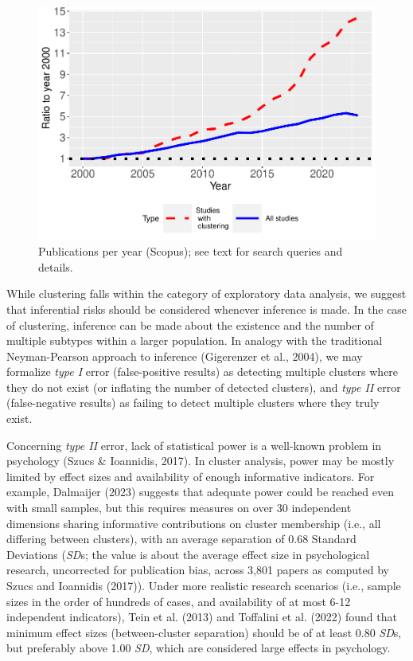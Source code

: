 \documentclass[
  man,floatsintext]{apa7}
\begin{document}
\begin{figure}

{\centering \includegraphics{paper_files/figure-latex/figure-literature-trends-1} 

}

\caption{Publications per year (Scopus); see text for search queries and details.}\label{fig:figure-literature-trends}
\end{figure}

While clustering falls within the category of exploratory data analysis, we suggest that inferential risks should be considered whenever inference is made. In the case of clustering, inference can be made about the existence and the number of multiple subtypes within a larger population. In analogy with the traditional Neyman-Pearson approach to inference (Gigerenzer et al., 2004), we may formalize \emph{type I} error (false-positive results) as detecting multiple clusters where they do not exist (or inflating the number of detected clusters), and \emph{type II} error (false-negative results) as failing to detect multiple clusters where they truly exist.

Concerning \emph{type II} error, lack of statistical power is a well-known problem in psychology (Szucs \& Ioannidis, 2017). In cluster analysis, power may be mostly limited by effect sizes and availability of enough informative indicators. For example, Dalmaijer (2023) suggests that adequate power could be reached even with small samples, but this requires measures on over 30 independent dimensions sharing informative contributions on cluster membership (i.e., all differing between clusters), with an average separation of 0.68 Standard Deviations (\emph{SD}s; the value is about the average effect size in psychological research, uncorrected for publication bias, across 3,801 papers as computed by Szucs and Ioannidis (2017)). Under more realistic research scenarios (i.e., sample sizes in the order of hundreds of cases, and availability of at most 6-12 independent indicators), Tein et al. (2013) and Toffalini et al. (2022) found that minimum effect sizes (between-cluster separation) should be of at least 0.80 \emph{SD}s, but preferably above 1.00 \emph{SD}, which are considered large effects in psychology.
\end{document}

